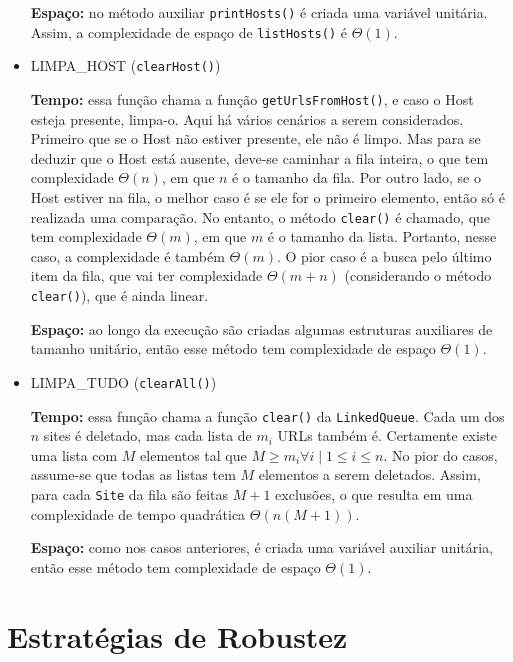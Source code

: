 \documentclass{article}
\def\code#1{\texttt{#1}}
\begin{document}
\begin{itemize}
        \textbf{Espaço:} no método auxiliar \code{printHosts()} é criada uma variável unitária. Assim, a complexidade de espaço de \code{listHosts()} é \( \Theta(1) \).

    \item LIMPA\_HOST (\code{clearHost()})

        \textbf{Tempo:} essa função chama a função \code{getUrlsFromHost()}, e caso o Host esteja presente, limpa-o. Aqui há vários cenários a serem considerados. Primeiro que se o Host não estiver presente, ele não é limpo. Mas para se deduzir que o Host está ausente, deve-se caminhar a fila inteira, o que tem complexidade \( \Theta(n) \), em que \( n \) é o tamanho da fila. Por outro lado, se o Host estiver na fila, o melhor caso é se ele for o primeiro elemento, então só é realizada uma comparação. No entanto, o método \code{clear()} é chamado, que tem complexidade \( \Theta(m) \), em que \( m \) é o tamanho da lista. Portanto, nesse caso, a complexidade é também \( \Theta(m) \). O pior caso é a busca pelo último item da fila, que vai ter complexidade \( \Theta(m + n) \) (considerando o método \code{clear()}), que é ainda linear. 

        \textbf{Espaço:} ao longo da execução são criadas algumas estruturas auxiliares de tamanho unitário, então esse método tem complexidade de espaço \( \Theta(1) \).

    \item LIMPA\_TUDO (\code{clearAll()})

        \textbf{Tempo:} essa função chama a função \code{clear()} da \code{LinkedQueue}. Cada um dos \( n \) sites é deletado, mas cada lista de \( m_i \) URLs também é. Certamente existe uma lista com \( M \) elementos tal que \( M \geq m_i \forall i \mid 1 \leq i \leq n \). No pior do casos, assume-se que todas as listas tem \( M \) elementos a serem deletados. Assim, para cada \code{Site} da fila são feitas \( M + 1 \) exclusões, o que resulta em uma complexidade de tempo quadrática \( \Theta(n(M+1)) \).

        \textbf{Espaço:} como nos casos anteriores, é criada uma variável auxiliar unitária, então esse método tem complexidade de espaço \( \Theta(1) \).

\end{itemize}

\section{Estratégias de Robustez}
\end{document}
